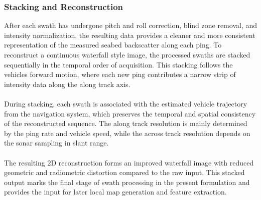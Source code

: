 \subsubsection{Stacking and Reconstruction}
After each swath has undergone pitch and roll correction, blind zone removal, and intensity normalization, the resulting data provides a cleaner and more consistent representation of the measured seabed backscatter along each ping. To reconstruct a continuous waterfall style image, the processed swaths are stacked sequentially in the temporal order of acquisition. This stacking follows the vehicles forward motion, where each new ping contributes a narrow strip of intensity data along the along track axis.
\\ \\
During stacking, each swath is associated with the estimated vehicle trajectory from the navigation system, which preserves the temporal and spatial consistency of the reconstructed sequence. The along track resolution is mainly determined by the ping rate and vehicle speed, while the across track resolution depends on the sonar sampling in slant range.
\\ \\
The resulting 2D reconstruction forms an improved waterfall image with reduced geometric and radiometric distortion compared to the raw input. This stacked output marks the final stage of swath processing in the present formulation and provides the input for later local map generation and feature extraction.
